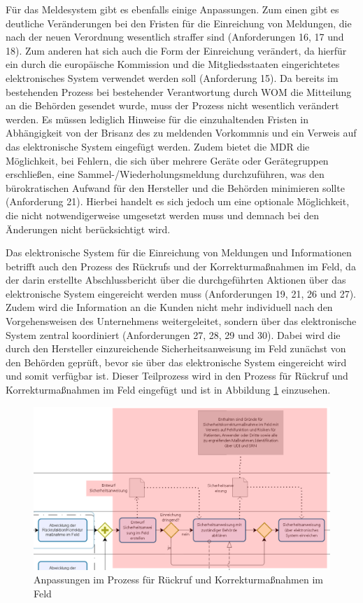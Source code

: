 \documentclass[a4paper,12pt]{report}
\begin{document}
Für das Meldesystem gibt es ebenfalls einige Anpassungen. Zum einen gibt es deutliche Veränderungen bei den Fristen für die Einreichung von Meldungen, die nach der neuen Verordnung wesentlich straffer sind (Anforderungen 16, 17 und 18). Zum anderen hat sich auch die Form der Einreichung verändert, da hierfür ein durch die europäische Kommission und die Mitgliedsstaaten eingerichtetes elektronisches System verwendet werden soll (Anforderung 15). Da bereits im bestehenden Prozess bei bestehender Verantwortung durch WOM die Mitteilung an die Behörden gesendet wurde, muss der Prozess nicht wesentlich verändert werden. Es müssen lediglich Hinweise für die einzuhaltenden Fristen in Abhängigkeit von der Brisanz des zu meldenden Vorkommnis und ein Verweis auf das elektronische System eingefügt werden. Zudem bietet die MDR die Möglichkeit, bei Fehlern, die sich über mehrere Geräte oder Gerätegruppen erschließen, eine Sammel-/Wiederholungsmeldung durchzuführen, was den bürokratischen Aufwand für den Hersteller und die Behörden minimieren sollte (Anforderung 21). Hierbei handelt es sich jedoch um eine optionale Möglichkeit, die nicht notwendigerweise umgesetzt werden muss und demnach bei den Änderungen nicht berücksichtigt wird.

Das elektronische System für die Einreichung von Meldungen und Informationen betrifft auch den Prozess des Rückrufs und der Korrekturmaßnahmen im Feld, da der darin erstellte Abschlussbericht über die durchgeführten Aktionen über das elektronische System eingereicht werden muss (Anforderungen 19, 21, 26 und 27). Zudem wird die Information an die Kunden nicht mehr individuell nach den Vorgehensweisen des Unternehmens weitergeleitet, sondern über das elektronische System zentral koordiniert (Anforderungen 27, 28, 29 und 30). Dabei wird die durch den Hersteller einzureichende Sicherheitsanweisung im Feld zunächst von den Behörden geprüft, bevor sie über das elektronische System eingereicht wird und somit verfügbar ist. Dieser Teilprozess wird in den Prozess für Rückruf und Korrekturmaßnahmen im Feld eingefügt und ist in Abbildung \ref{recall_message_for_customers} einzusehen.
\begin{figure}[ht]
\centering
\includegraphics[width=1\textwidth]{Images/recall_message_for_customers}
\caption[Anpassungen im Prozess für Rückruf und Korrekturmaßnahmen im Feld]{Anpassungen im Prozess für Rückruf und Korrekturmaßnahmen im Feld}
\label{recall_message_for_customers}
\end{figure}
\end{document}
